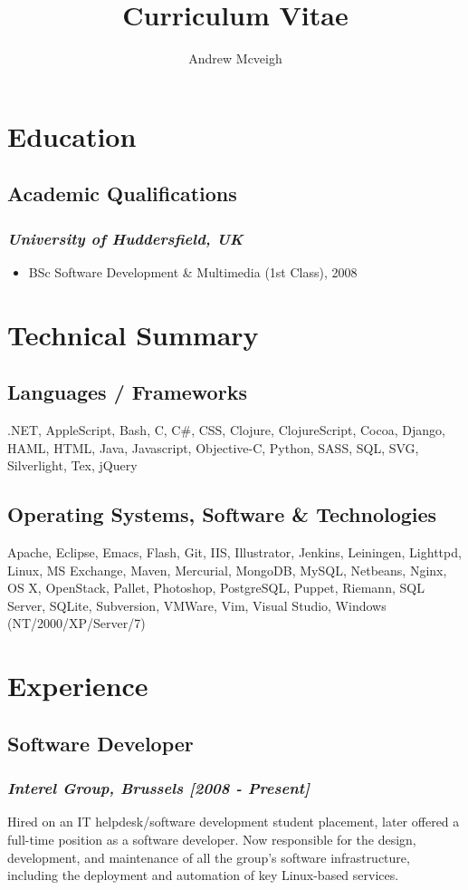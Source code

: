 \documentclass{article}
\title{Curriculum Vitae}
\author{Andrew Mcveigh}
\date{}
\begin{document}
\maketitle
\section*{Education}
\subsection*{Academic Qualifications}
\subsubsection*{\emph{University of Huddersfield, UK}}
\begin{itemize}
\item BSc Software Development \& Multimedia (1st Class), 2008
\end{itemize}
\section*{Technical Summary}
\subsection*{Languages / Frameworks}
.NET, AppleScript, Bash, C, C\#, CSS, Clojure, ClojureScript, Cocoa, Django, HAML, HTML, Java, Javascript, Objective-C, Python, SASS, SQL, SVG, Silverlight, Tex, jQuery
\subsection*{Operating Systems, Software \& Technologies}
Apache, Eclipse, Emacs, Flash, Git, IIS, Illustrator, Jenkins, Leiningen, Lighttpd, Linux, MS Exchange, Maven, Mercurial, MongoDB, MySQL, Netbeans, Nginx, OS X, OpenStack, Pallet, Photoshop, PostgreSQL, Puppet, Riemann, SQL Server, SQLite, Subversion, VMWare, Vim, Visual Studio, Windows (NT/2000/XP/Server/7)
\section*{Experience}
\subsection*{Software Developer}
\subsubsection*{\emph{Interel Group, Brussels  [2008 - Present]}}
Hired on an IT helpdesk/software development student placement,
          later offered a full-time position as a software developer. Now
          responsible for the design, development, and maintenance of all the
          group's software infrastructure, including the deployment
          and automation of key Linux-based services.
\end{document}

